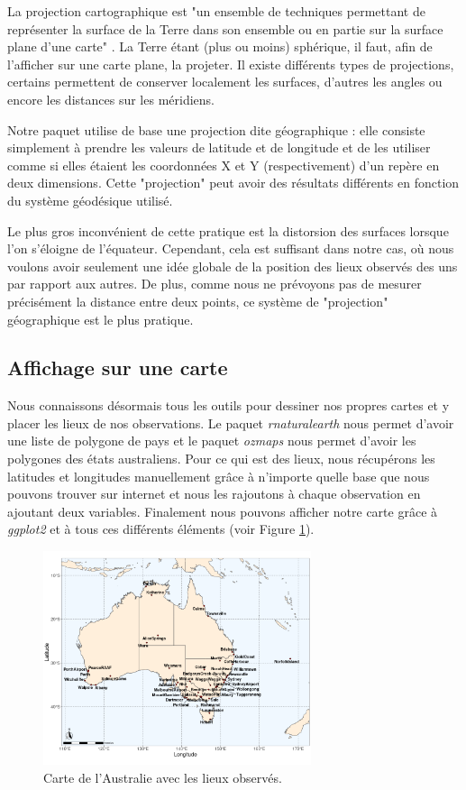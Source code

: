 \documentclass{article}
\begin{document}
La projection cartographique est "un ensemble de techniques permettant de représenter la surface de la Terre dans son ensemble ou en partie sur la surface plane d'une carte" \cite{frwiki:181713838}. La Terre étant (plus ou moins) sphérique, il faut, afin de l'afficher sur une carte plane, la projeter. Il existe différents types de projections, certains permettent de conserver localement les surfaces, d'autres les angles ou encore les distances sur les méridiens. 

Notre paquet utilise de base une projection dite géographique : elle consiste simplement à prendre les valeurs de latitude et de longitude et de les utiliser comme si elles étaient les coordonnées X et Y (respectivement) d'un repère en deux dimensions. Cette "projection" peut avoir des résultats différents en fonction du système géodésique utilisé. 

Le plus gros inconvénient de cette pratique est la distorsion des surfaces lorsque l'on s'éloigne de l'équateur. Cependant, cela est suffisant dans notre cas, où nous voulons avoir seulement une idée globale de la position des lieux observés des uns par rapport aux autres. De plus, comme nous ne prévoyons pas de mesurer précisément la distance entre deux points, ce système de "projection" géographique est le plus pratique.

\subsection{Affichage sur une carte}

Nous connaissons désormais tous les outils pour dessiner nos propres cartes et y placer les lieux de nos observations. Le paquet \emph{rnaturalearth} nous permet d'avoir une liste de polygone de pays et le paquet \emph{ozmaps} nous permet d'avoir les polygones des états australiens. Pour ce qui est des lieux, nous récupérons les latitudes et longitudes manuellement grâce à n'importe quelle base que nous pouvons trouver sur internet et nous les rajoutons à chaque observation en ajoutant deux variables. Finalement nous pouvons afficher notre carte grâce à \emph{ggplot2} et à tous ces différents éléments (voir Figure \ref{fig:carte_australie}).

\begin{figure}[htp]
    \centering
    \includegraphics[width=0.7\textwidth]{Images/Cartographie/Australia_full_map.png}
    \caption{Carte de l'Australie avec les lieux observés.}
    \label{fig:carte_australie}
\end{figure}
\end{document}
